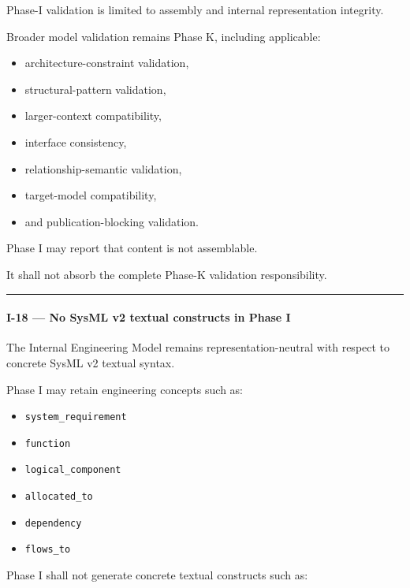 Phase-I validation is limited to assembly and internal representation integrity.

Broader model validation remains Phase K, including applicable:

\begin{itemize}
\tightlist
\item
  architecture-constraint validation,
\item
  structural-pattern validation,
\item
  larger-context compatibility,
\item
  interface consistency,
\item
  relationship-semantic validation,
\item
  target-model compatibility,
\item
  and publication-blocking validation.
\end{itemize}

Phase I may report that content is not assemblable.

It shall not absorb the complete Phase-K validation responsibility.

\begin{center}\rule{0.5\linewidth}{0.5pt}\end{center}

\hypertarget{i-18--no-sysml-v2-textual-constructs-in-phase-i}{%
\paragraph{I-18 --- No SysML v2 textual constructs in Phase I}\label{i-18--no-sysml-v2-textual-constructs-in-phase-i}}

The Internal Engineering Model remains representation-neutral with respect to concrete SysML v2 textual syntax.

Phase I may retain engineering concepts such as:

\begin{itemize}
\tightlist
\item
  \texttt{system\_requirement}
\item
  \texttt{function}
\item
  \texttt{logical\_component}
\item
  \texttt{allocated\_to}
\item
  \texttt{dependency}
\item
  \texttt{flows\_to}
\end{itemize}

Phase I shall not generate concrete textual constructs such as:

